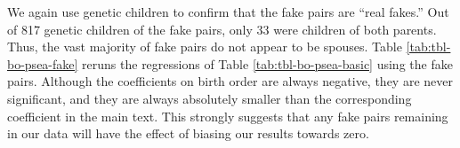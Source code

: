 \documentclass[
]{article}
\begin{document}
We again use genetic children to confirm that the fake pairs are ``real
fakes.'' Out of 817 genetic children of the fake pairs, only
33 were children of both parents. Thus, the vast majority of
fake pairs do not appear to be spouses. Table
\ref{tab:tbl-bo-psea-fake} reruns the regressions of Table
\ref{tab:tbl-bo-psea-basic} using the fake pairs. Although the
coefficients on birth order are always negative, they are never
significant, and they are always absolutely smaller than the
corresponding coefficient in the main text. This strongly suggests that
any fake pairs remaining in our data will have the effect of biasing our
results towards zero.

 
  \providecommand{\huxb}[2]{\arrayrulecolor[RGB]{#1}\global\arrayrulewidth=#2pt}
  \providecommand{\huxvb}[2]{\color[RGB]{#1}\vrule width #2pt}
  \providecommand{\huxtpad}[1]{\rule{0pt}{#1}}
  \providecommand{\huxbpad}[1]{\rule[-#1]{0pt}{#1}}
\end{document}
